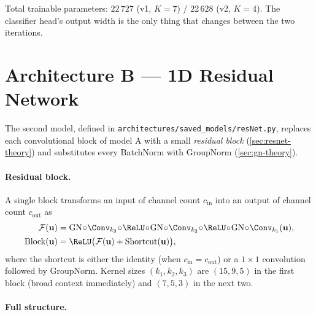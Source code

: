 Total trainable parameters: $22\,727$ (v1, $K = 7$) /
$22\,628$ (v2, $K = 4$). The classifier head's output width is the
only thing that changes between the two iterations.

\section{Architecture B --- 1D Residual Network}
\label{sec:archi-resnet}

The second model, defined in
\texttt{architectures/saved\_models/resNet.py}, replaces each
convolutional block of model A with a small \emph{residual block}
(\cref{sec:resnet-theory}) and substitutes every BatchNorm with
GroupNorm (\cref{sec:gn-theory}).

\paragraph{Residual block.} A single block transforms an input of
channel count $c_{\text{in}}$ into an output of channel count
$c_{\text{out}}$ as
\begin{align*}
    \mathcal{F}(\mathbf{u}) &= \mathrm{GN} \!\circ\! \Conv_{k_3} \!\circ\! \ReLU \!\circ\! \mathrm{GN} \!\circ\! \Conv_{k_2} \!\circ\! \ReLU \!\circ\! \mathrm{GN} \!\circ\! \Conv_{k_1} (\mathbf{u}), \\
    \text{Block}(\mathbf{u}) &= \ReLU\bigl( \mathcal{F}(\mathbf{u}) + \mathrm{Shortcut}(\mathbf{u}) \bigr),
\end{align*}
where the shortcut is either the identity (when $c_{\text{in}} =
c_{\text{out}}$) or a $1{\times}1$ convolution followed by GroupNorm.
Kernel sizes $(k_1, k_2, k_3)$ are $(15, 9, 5)$ in the first block
(broad context immediately) and $(7, 5, 3)$ in the next two.

\paragraph{Full structure.}

